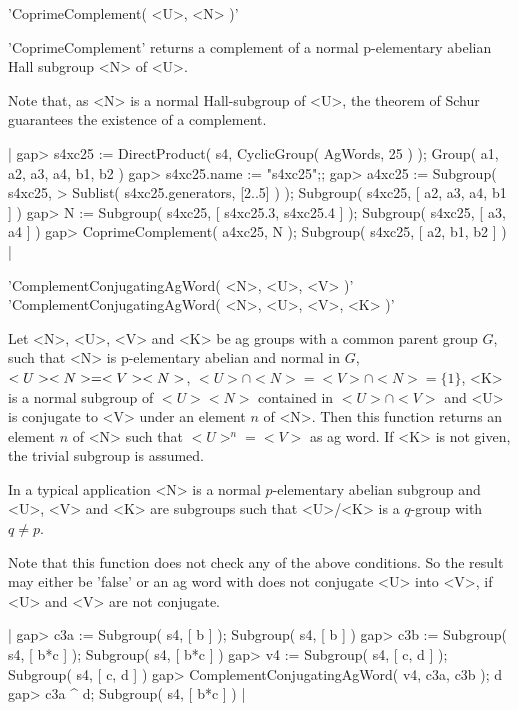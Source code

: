 
'CoprimeComplement( <U>, <N> )'

'CoprimeComplement' returns a complement of a normal p-elementary abelian
Hall subgroup <N> of <U>.

Note that, as <N> is a normal Hall-subgroup of <U>, the  theorem of Schur
guarantees the existence of a complement.

|    gap> s4xc25 := DirectProduct( s4, CyclicGroup( AgWords, 25 ) );
    Group( a1, a2, a3, a4, b1, b2 )
    gap> s4xc25.name := "s4xc25";;
    gap> a4xc25 := Subgroup( s4xc25,
    >                  Sublist( s4xc25.generators, [2..5] ) );
    Subgroup( s4xc25, [ a2, a3, a4, b1 ] )
    gap> N := Subgroup( s4xc25, [ s4xc25.3, s4xc25.4 ] );
    Subgroup( s4xc25, [ a3, a4 ] )
    gap> CoprimeComplement( a4xc25, N );
    Subgroup( s4xc25, [ a2, b1, b2 ] ) |


'ComplementConjugatingAgWord( <N>, <U>, <V> )'\\
'ComplementConjugatingAgWord( <N>, <U>, <V>, <K> )'

Let <N>, <U>, <V> and <K>  be ag groups with  a common  parent group $G$,
such  that <N> is  p-elementary abelian  and normal  in  $G$, $<U>\*<N> =
<V>\*<N>$, $<U>\cap <N> = <V> \cap <N> = \{1\}$, <K> is a normal subgroup
of $<U> <N>$ contained in $<U>\cap <V>$ and <U> is conjugate to <V> under
an element $n$ of <N>.  Then this function returns  an element $n$ of <N>
such that $<U>^n =  <V>$ as ag word.   If <K>  is not given,  the trivial
subgroup is assumed.

In a typical application  <N> is a normal $p$-elementary abelian subgroup
and <U>,  <V> and <K> are subgroups such that <U>/<K> is a $q$-group with
$q\neq p$.

Note that this function does  not check any  of the above conditions.  So
the result may either be  'false' or an ag  word with does not  conjugate
<U> into <V>, if <U> and <V> are not conjugate.

|    gap> c3a := Subgroup( s4, [ b ] );
    Subgroup( s4, [ b ] )
    gap> c3b := Subgroup( s4, [ b*c ] );
    Subgroup( s4, [ b*c ] )
    gap> v4 := Subgroup( s4, [ c, d ] );
    Subgroup( s4, [ c, d ] )
    gap> ComplementConjugatingAgWord( v4, c3a, c3b );
    d
    gap> c3a ^ d;
    Subgroup( s4, [ b*c ] ) |

